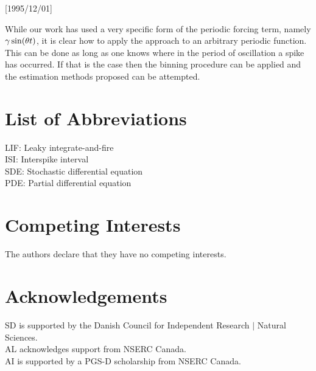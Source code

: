\NeedsTeXFormat{LaTeX2e}[1995/12/01] \documentclass[10pt]{bmc_article}
\newenvironment{bmcformat}{\begin{raggedright}\baselineskip20pt\sloppy\setboolean{publ}{false}}{\end{raggedright}\baselineskip20pt\sloppy}
\begin{document}
\begin{bmcformat}
While our work has used a very specific form of the periodic forcing term,
namely ${\gamma } \sin({\theta} t)$,  it is clear how to apply the approach to an arbitrary
periodic function. This can be done as long as one knows where in the period of
oscillation a spike has occurred. If that is the case then the binning procedure
can be applied and the estimation methods proposed can be attempted. 

\section*{List of Abbreviations}  
LIF: Leaky integrate-and-fire \\
ISI: Interspike interval \\
SDE: Stochastic differential equation\\
PDE: Partial differential equation\\
\section*{Competing Interests}
The authors declare that they have no competing interests.
\section*{Acknowledgements}
SD is supported by the Danish Council for Independent Research $\mid$ 
Natural Sciences.
\\ 
AL acknowledges support from NSERC Canada.  
\\
AI is supported by a PGS-D scholarship from NSERC Canada. 
 

\end{bmcformat}
\end{document}
